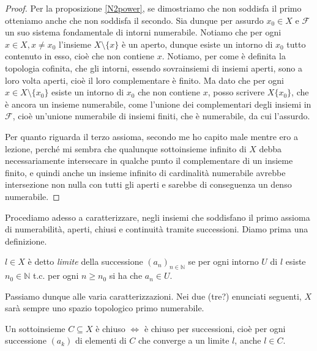 \documentclass{article}
\begin{document}
\begin{proof}
	Per la proposizione \ref{N2power}, se dimostriamo che non soddisfa il primo
	otteniamo anche che non soddisfa il secondo. Sia dunque per assurdo $x_0 \in
	X$ e $\mathcal{F}$ un suo sistema fondamentale di intorni numerabile.
	Notiamo che per ogni $x \in X, x\not=x_0$ l'insieme $X \setminus \{ x\}$ è
	un aperto, dunque esiste un intorno di $x_0$ tutto contenuto in esso, cioè
	che non contiene $x$. Notiamo, per come è definita la topologia cofinita,
	che gli intorni, essendo sovrainsiemi di insiemi aperti, sono a loro volta
	aperti, cioè il loro complementare è finito. Ma dato che per ogni $x \in X
	\setminus \{ x_0\}$ esiste un intorno di $x_0$ che non contiene $x$, posso
	scrivere $X \{ x_0\}$, che è ancora un insieme numerabile, come l'unione dei
	complementari degli insiemi in $\mathcal{F}$, cioè un'unione numerabile di
	insiemi finiti, che è numerabile, da cui l'assurdo.

	Per quanto riguarda il terzo assioma, secondo me ho capito male mentre ero a
	lezione, perché mi sembra che qualunque sottoinsieme infinito di $X$ debba
	necessariamente intersecare in qualche punto il complementare di un insieme
	finito, e quindi anche un insieme infinito di cardinalità numerabile avrebbe
	intersezione non nulla con tutti gli aperti e sarebbe di conseguenza un
	denso numerabile.
\end{proof}

Procediamo adesso a caratterizzare, negli insiemi che soddisfano il primo
assioma di numerabilità, aperti, chiusi e continuità tramite successioni.
Diamo prima una definizione.

\begin{defn}
	$l \in X$ è detto \textit{limite} della successione $(a_n)_{n \in
	\mathbb{N}}$ se per ogni intorno $U$ di $l$ esiste $n_0 \in \mathbb{N}$ t.c.
	per ogni $n \ge n_0$ si ha che $a_n \in U$.
\end{defn}

Passiamo dunque alle varia caratterizzazioni. Nei due (tre?) enunciati seguenti,
$X$ sarà sempre uno spazio topologico primo numerabile.


\begin{prop}
	Un sottoinsieme $C \subseteq X$ è chiuso $\Leftrightarrow$ è chiuso per
	successioni, cioè per ogni successione $(a_k)$ di elementi di $C$ che
	converge a un limite $l$, anche $l \in C$.
\end{prop}
\end{document}
